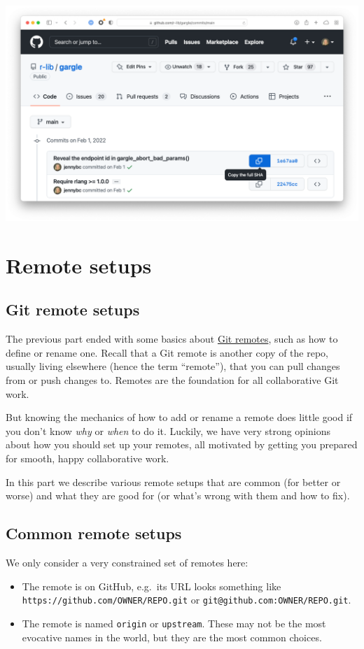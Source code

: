 \documentclass[
]{book}
\providecommand{\tightlist}{%
  \setlength{\itemsep}{0pt}\setlength{\parskip}{0pt}}
\begin{document}
\begin{center}\includegraphics[width=0.6\linewidth]{img/github-screenshot-copy-the-full-sha} \end{center}

\part{Remote setups}\label{part-remote-setups}

\chapter*{Git remote setups}\label{remote-scenarios-intro}

The previous part ended with some basics about \hyperref[git-remotes]{Git remotes}, such as how to define or rename one. Recall that a Git remote is another copy of the repo, usually living elsewhere (hence the term ``remote''), that you can pull changes from or push changes to. Remotes are the foundation for all collaborative Git work.

But knowing the mechanics of how to add or rename a remote does little good if you don't know \emph{why} or \emph{when} to do it. Luckily, we have very strong opinions about how you should set up your remotes, all motivated by getting you prepared for smooth, happy collaborative work.

In this part we describe various remote setups that are common (for better or worse) and what they are good for (or what's wrong with them and how to fix).

\chapter{Common remote setups}\label{common-remote-setups}

We only consider a very constrained set of remotes here:

\begin{itemize}
\tightlist
\item
  The remote is on GitHub, e.g.~its URL looks something like \texttt{https://github.com/OWNER/REPO.git} or \texttt{git@github.com:OWNER/REPO.git}.
\item
  The remote is named \texttt{origin} or \texttt{upstream}. These may not be the most evocative names in the world, but they are the most common choices.
\end{itemize}
\end{document}
